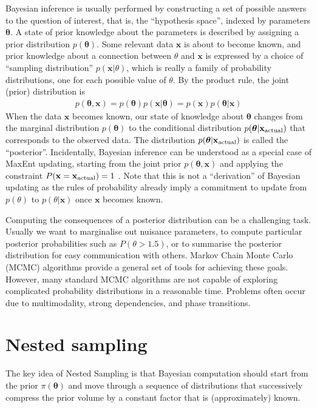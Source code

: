 \documentclass[
  ,final            %
  ]
  {aipproc}
\newcommand{\pars}{\boldsymbol{\theta}}
\newcommand{\data}{\mathbf{x}}
\begin{document}
Bayesian inference is usually performed by
constructing a set of possible answers to the question of
interest, that is, the ``hypothesis space'', indexed by parameters $\pars$.
A state of prior knowledge about the parameters is described by assigning a
prior distribution $p(\pars)$. Some relevant data $\data$ is about to become
known, and prior knowledge about a connection between $\theta$ and $\data$ is
expressed by a choice of ``sampling distribution'' $p(\data | \theta)$, which
is really a family of probability distributions, one for each possible value of
$\theta$. By the product rule, the joint (prior) distribution is
\begin{eqnarray}
p(\pars, \data) = p(\pars) p(\data | \pars) = p(\data)p(\pars | \data)
\end{eqnarray}
When the
data $\data$ becomes known, our state of knowledge about $\pars$ changes
from the marginal distribution $p(\pars)$ to the conditional distribution
$p(\pars | \data_{\rm actual})$
that corresponds to the observed data. The distribution
$p(\pars | \data_{\rm actual})$ is
called the ``posterior''.
Incidentally, Bayesian inference can be understood as a special case of
MaxEnt updating, starting from the joint prior $p(\pars, \data)$ and applying
the constraint $P(\data = \data_{\rm actual}) = 1$ \citep{caticha}. Note that
this is not a ``derivation'' of Bayesian updating as the rules of probability
already imply a commitment to update from $p(\theta)$ to $p(\theta | \data)$
once $\data$ becomes known.

Computing the consequences of a posterior distribution can be a challenging
task. Usually we want to marginalise out nuisance parameters, to compute
particular posterior probabilities such as $P(\theta > 1.5)$, or to summarise
the posterior distribution for easy communication with others.
Markov Chain Monte Carlo (MCMC) algorithms provide a general set of tools
for achieving these goals. However, many standard MCMC algorithms are not
capable of exploring complicated probability distributions in a reasonable time.
Problems often occur due to multimodality, strong dependencies, and phase
transitions.

\section{Nested sampling}
The key idea of Nested Sampling \citep{skilling} is that Bayesian computation
should start from the prior $\pi(\pars)$ and move through a sequence of
distributions that successively compress the prior volume by a constant factor
that is (approximately) known.
\end{document}
